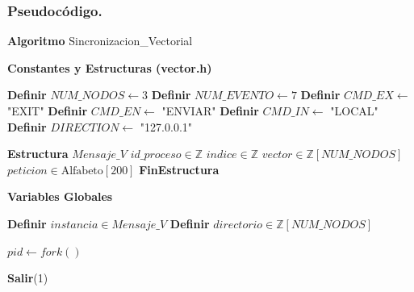 \subsubsection{Pseudocódigo.}

\begin{tcolorbox}[colback=white, colframe=azul_unam, title=Pseudocódigo: sinc\_vectoriales.c (P2P), breakable]

\textbf{Algoritmo} Sincronizacion\_Vectorial


\textbf{Constantes y Estructuras (vector.h)}

\begin{algorithmic}[1]

\State \textbf{Definir} $NUM\_NODOS \gets 3$
\State \textbf{Definir} $NUM\_EVENTO \gets 7$
\State \textbf{Definir} $CMD\_EX \gets$ "EXIT"
\State \textbf{Definir} $CMD\_EN \gets$ "ENVIAR"
\State \textbf{Definir} $CMD\_IN \gets$ "LOCAL"
\State \textbf{Definir} $DIRECTION \gets$ "127.0.0.1"

\vspace{0.2cm}

\State \textbf{Estructura} $Mensaje\_V$
\State \quad $id\_proceso \in \mathbb{Z}$
\State \quad $indice \in \mathbb{Z}$
\State \quad $vector \in \mathbb{Z}[NUM\_NODOS]$ 
\State \quad $peticion \in \text{Alfabeto}[200]$
\State \textbf{FinEstructura}

\end{algorithmic}

\vspace{0.3cm}


\textbf{Variables Globales}

\begin{algorithmic}[1]
\State \textbf{Definir} $instancia \in Mensaje\_V$
\State \textbf{Definir} $directorio \in \mathbb{Z}[NUM\_NODOS]$
\end{algorithmic}

\vspace{0.3cm}

\begin{algorithmic}[1]
    

\State $pid \gets fork()$

    \State \textbf{Salir}(1)
\EndIf


\end{algorithmic}
\end{tcolorbox}
